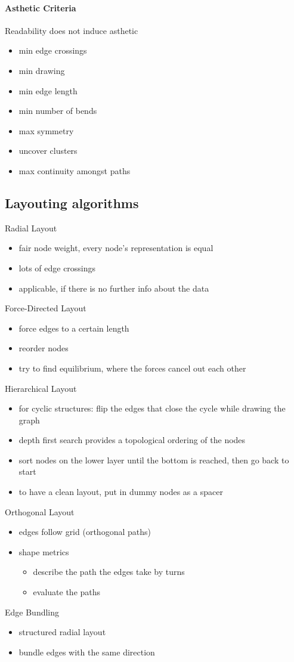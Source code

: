 \documentclass[ngerman]{scrartcl}
\begin{document}
\paragraph{Asthetic Criteria}
Readability does not induce asthetic
\begin{itemize}
  \item min edge crossings
  \item min drawing
  \item min edge length
  \item min number of bends
  \item max symmetry
  \item uncover clusters
  \item max continuity amongst paths
\end{itemize}

\subsection{Layouting algorithms}
Radial Layout
\begin{itemize}
  \item fair node weight, every node's representation is equal
  \item lots of edge crossings
  \item applicable, if there is no further info about the data
\end{itemize}
Force-Directed Layout
\begin{itemize}
  \item force edges to a certain length
  \item reorder nodes
  \item try to find equilibrium, where the forces cancel out each other
\end{itemize}
Hierarchical Layout
\begin{itemize}
  \item for cyclic structures: flip the edges that close the cycle while drawing the graph
  \item depth first search provides a topological ordering of the nodes
  \item sort nodes on the lower layer until the bottom is reached, then go back to start
  \item to have a clean layout, put in dummy nodes as a spacer
\end{itemize}
Orthogonal Layout
\begin{itemize}
  \item edges follow grid (orthogonal paths)
  \item shape metrics
  \begin{itemize}
    \item describe the path the edges take by turns
    \item evaluate the paths 
  \end{itemize}
\end{itemize}
Edge Bundling
\begin{itemize}
  \item structured radial layout
  \item bundle edges with the same direction
\end{itemize}
\end{document}
